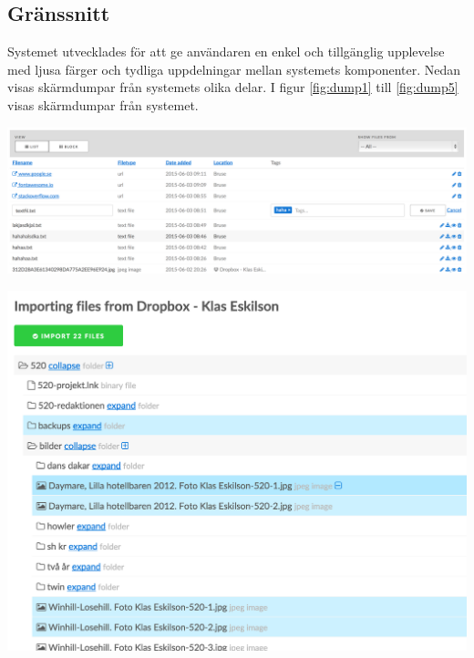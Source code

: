 \subsection{Gränssnitt}

Systemet utvecklades för att ge användaren en enkel och tillgänglig upplevelse
med ljusa färger och tydliga uppdelningar mellan systemets komponenter. Nedan
visas skärmdumpar från systemets olika delar. I figur \ref{fig:dump1} till
\ref{fig:dump5} visas skärmdumpar från systemet.

\begin{Figure}
  \centering
    \includegraphics[width=0.9\linewidth]{figures/screenshots/dump1.png}
\end{Figure}

\begin{Figure}
  \centering
    \includegraphics[width=0.8\linewidth]{figures/screenshots/dump2.png}
\end{Figure}


